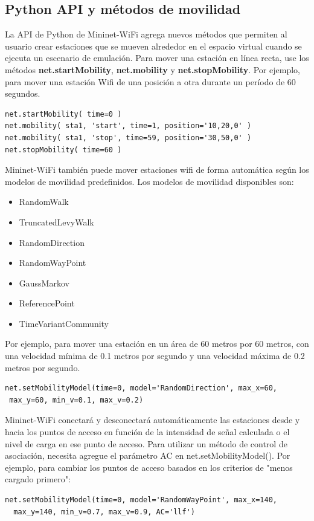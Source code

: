\subsection{Python API y métodos de movilidad}
La API de Python de Mininet-WiFi agrega nuevos métodos que permiten al usuario crear estaciones que se mueven alrededor en el espacio virtual cuando se ejecuta un escenario de emulación.\newline
\newline
Para mover una estación en línea recta, use los métodos \textbf{net.startMobility}, \textbf{net.mobility} y \textbf{net.stopMobility}. Por ejemplo, para mover una estación Wifi de una posición a
otra durante un período de 60 segundos.
\begin{verbatim}
net.startMobility( time=0 )
net.mobility( sta1, 'start', time=1, position='10,20,0' )
net.mobility( sta1, 'stop', time=59, position='30,50,0' )
net.stopMobility( time=60 )
\end{verbatim}
Mininet-WiFi también puede mover estaciones wifi de forma automática según los modelos de movilidad predefinidos. Los modelos de movilidad disponibles son:
\begin{itemize}
    \item RandomWalk
    \item TruncatedLevyWalk
    \item RandomDirection
    \item RandomWayPoint
    \item GaussMarkov
    \item ReferencePoint
    \item TimeVariantCommunity
\end{itemize}
Por ejemplo, para mover una estación en un área de 60 metros por 60
metros, con una velocidad mínima de 0.1 metros por segundo y una velocidad máxima de 0.2 metros por segundo.
\begin{verbatim}
net.setMobilityModel(time=0, model='RandomDirection', max_x=60, 
 max_y=60, min_v=0.1, max_v=0.2)
\end{verbatim}
Mininet-WiFi conectará y desconectará automáticamente las estaciones desde y hacia los puntos de acceso en función de la intensidad de señal calculada o el nivel de carga en ese punto de acceso. 
\newline
\newline
Para utilizar un método de control de asociación, necesita agregue el parámetro AC en net.setMobilityModel(). Por ejemplo, para cambiar los puntos de acceso basados en
los criterios de "menos cargado primero":
\begin{verbatim}
net.setMobilityModel(time=0, model='RandomWayPoint', max_x=140,
  max_y=140, min_v=0.7, max_v=0.9, AC='llf')
\end{verbatim}

